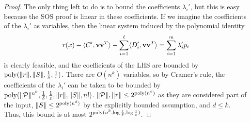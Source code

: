 \begin{proof}
The only thing left to do is to bound the coefficients $\lambda_i'$, but this is easy because the SOS proof is linear in these coefficients. If we imagine the coefficients of the $\lambda_i'$ as variables, then the linear system induced by the polynomial identity
\[r(x) - \langle C', {\bf v}{\bf v}^T\rangle - \sum_{i=1}^\ell \langle D_i', {\bf v}{\bf v}^T\rangle = \sum_{i=1}^m \lambda_i' p_i\]
is clearly feasible, and the coefficients of the LHS are bounded by $\operatorname{poly}(\|r\|, \|S\|, \frac{1}{\delta}, \frac{1}{\varepsilon})$. There are $O(n^k)$ variables, so by Cramer's rule, the coefficients of the $\lambda_i'$ can be taken to be bounded by $\operatorname{poly}(\|\mathcal P\|^{n^k}, \frac{1}{\delta}, \frac{1}{\varepsilon}, \|r\|, \|S\|, n!)$. $\|\mathcal P\|, \|r\| \leq 2^{\operatorname{poly}(n^d)}$ as they are considered part of the input, $\|S\| \leq 2^{\operatorname{poly}(n^d)}$ by the explicitly bounded assumption, and $d \leq k$. Thus, this bound is at most $2^{\operatorname{poly}(n^k, \log \frac{1}{\delta}, \log \frac{1}{\varepsilon})}$.



\end{proof}
